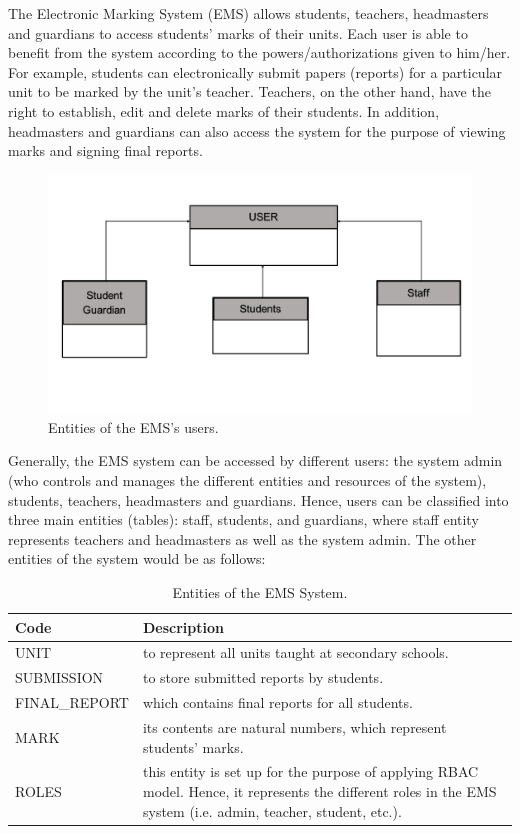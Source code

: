 The Electronic Marking System (EMS) allows students, teachers, headmasters and guardians to access students’ marks of their units.  Each user is able to benefit from the system according to the powers/authorizations given to him/her.  For example, students can electronically submit papers (reports) for a particular unit to be marked by the unit’s teacher.  Teachers, on the other hand, have the right to establish, edit and delete marks of their students.  In addition, headmasters and guardians can also access the system for the purpose of viewing marks and signing final reports.  

\begin{figure}[bht]
\centering
\includegraphics[scale=0.26]{EMSEntities.png}
\caption{Entities of the EMS's users.}
\label{fig:RBACPol}
\end{figure}

Generally, the EMS system can be accessed by different users: the system admin (who controls and manages the different entities and resources of the system), students, teachers, headmasters and guardians.  Hence, users can be classified into three main entities (tables): staff, students, and guardians, where staff entity represents teachers and headmasters as well as the system admin.
The other entities of the system would be as follows:

\begin{table}[bth]
\centering
\caption{Entities of the EMS System.}
\small
{}
\begin{tabular}{p{0.8 in} p{6 in}} \hline 
\hline
Code & Description\\\hline\hline

UNIT& to represent all units taught at secondary schools. \\ 
SUBMISSION& to store submitted reports by students. \\ 
FINAL\_REPORT& which contains final reports for all students. \\ 
MARK& its contents are natural numbers, which represent students’ marks. \\ 
ROLES& this entity is set up for the purpose of applying RBAC model.  Hence, it represents the different roles in the EMS system (i.e. admin, teacher, student, etc.).\\ \hline\hline
\end{tabular}
\label{tab:namehere}
\end{table}



